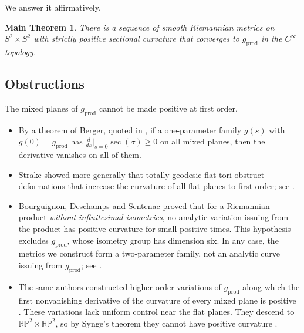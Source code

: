 \documentclass[11pt]{amsart}
\newtheorem*{maintheorem}{Main Theorem}
\theoremstyle{definition}
\theoremstyle{remark}
\newcommand{\RP}{\mathbb{RP}}
\newcommand{\sect}{\operatorname{sec}}
\newcommand{\gprod}{g_{\mathrm{prod}}}
\begin{document}
We answer it affirmatively.

\begin{maintheorem}
There is a sequence of smooth Riemannian metrics on $S^2\times S^2$ with strictly positive sectional curvature that converges to $\gprod$ in the $C^\infty$ topology.
\end{maintheorem}

\subsection*{Obstructions}
The mixed planes of $\gprod$ cannot be made positive at first order.
\begin{itemize}[leftmargin=*]
\item By a theorem of Berger, quoted in \cite[\S1.1]{BDS1}, if a one-parameter family $g(s)$ with $g(0)=\gprod$ has $\frac{d}{ds}\big|_{s=0}\sect(\sigma)\ge0$ on all mixed planes, then the derivative vanishes on all of them.
\item Strake \cite{St1,St2} showed more generally that totally geodesic flat tori obstruct deformations that increase the curvature of all flat planes to first order; see \cite[\S3.4]{Be}.
\item Bourguignon, Deschamps and Sentenac proved \cite[\S1.3]{BDS1} that for a Riemannian product \emph{without infinitesimal isometries}, no analytic variation issuing from the product has positive curvature for small positive times. This hypothesis excludes $\gprod$, whose isometry group has dimension six. In any case, the metrics we construct form a two-parameter family, not an analytic curve issuing from $\gprod$; see \cite[Remark~3.14]{Be}.
\item The same authors constructed higher-order variations of $\gprod$ along which the first nonvanishing derivative of the curvature of every mixed plane is positive \cite{BDS2}. These variations lack uniform control near the flat planes. They descend to $\RP^2\times\RP^2$, so by Synge's theorem they cannot have positive curvature \cite[Remark~3.11]{Be}.
\end{itemize}
\end{document}
